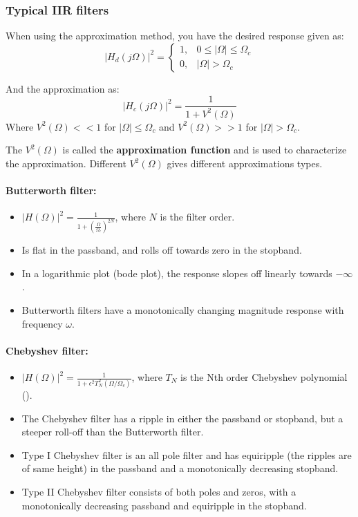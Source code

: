 \documentclass{article}
\begin{document}
\subsubsection{Typical IIR filters}
When using the approximation method, you have the desired response given as:
\begin{equation}
    |H_d (j\Omega)|^2 = \begin{cases}
        1, & 0 \leq |\Omega| \leq \Omega_c \\
        0, & |\Omega| > \Omega_c
    \end{cases}
\end{equation}

And the approximation as:
\begin{equation}
    |H_c (j\Omega)|^2 = \frac{1}{1 + V^2(\Omega)}
\end{equation}
Where $V^2(\Omega) << 1$ for $|\Omega| \leq \Omega_c$ and $V^2(\Omega) >> 1$ for $|\Omega| > \Omega_c$.

The $V^2(\Omega)$ is called the \textbf{approximation function} and is used to characterize the approximation. Different $V^2(\Omega)$ gives different approximations types.

\paragraph{Butterworth filter:}
\begin{itemize}
    \item $ |H(\Omega)|^2 = \frac{1}{1+\left(\frac{\Omega}{\Omega_c}\right)^{2N}}$, where $N$ is the filter order.
    \item Is flat in the passband, and rolls off towards zero in the stopband.
    \item In a logarithmic plot (bode plot), the response slopes off linearly towards $-\infty$.
    \item Butterworth filters have a monotonically changing magnitude response with frequency $\omega$.
\end{itemize}

\paragraph{Chebyshev filter:}
\begin{itemize}
    \item $|H(\Omega)|^2 = \frac{1}{1 + \epsilon^2 T_N^2 (\Omega / \Omega_c)}$, where $T_N$ is the Nth order Chebyshev polynomial ().
    \item The Chebyshev filter has a ripple in either the passband or stopband, but a steeper roll-off than the Butterworth filter.
    \item Type I Chebyshev filter is an all pole filter and has equiripple (the ripples are of same height) in the passband and a monotonically decreasing stopband.
    \item Type II Chebyshev filter consists of both poles and zeros, with a monotonically decreasing passband and equiripple in the stopband.
\end{itemize}
\end{document}
